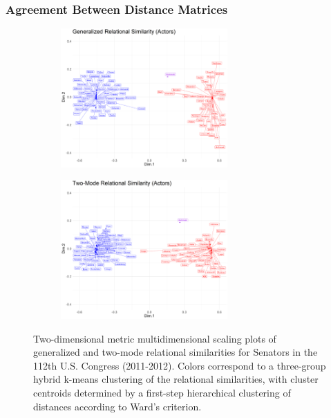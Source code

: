 \documentclass[a4paper,fleqn]{cas-sc}
\begin{document}
\subsubsection{Agreement Between Distance Matrices}
\begin{figure}[ht!]
     \begin{subfigure}[b]{1.0\textwidth}
        \centering
        \includegraphics[width=0.7\textwidth]{Plots/grs-actors-sb.png}
        \caption{}
        \label{fig:grs-actors-sb}
    \end{subfigure} 
     \begin{subfigure}[b]{1.0\textwidth}
        \centering
        \includegraphics[width=0.7\textwidth]{Plots/tmrs-actors-sb.png}
        \caption{}
        \label{fig:tmrs-actors-sb}
    \end{subfigure} 
    \caption{Two-dimensional metric multidimensional scaling plots of generalized and two-mode relational similarities for Senators in the 112th U.S. Congress (2011-2012). Colors correspond to a three-group hybrid k-means clustering of the relational similarities, with cluster centroids determined by a first-step hierarchical clustering of distances according to Ward's \citeyearpar{ward63} criterion.}
    \label{fig:actors-sb}
 \end{figure}
\end{document}

